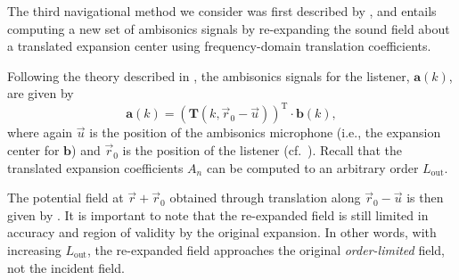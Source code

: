 The third navigational method we consider was first described by \citet{MenziesAlAkaidi2007a}, and entails computing a new set of ambisonics signals by re-expanding the sound field about a translated expansion center using frequency-domain translation coefficients.

Following the theory described in , the ambisonics signals for the listener, $\mathbf{a}(k)$, are given by
\begin{equation}\label{eq:03_Navigation_Techniques:Forward_Ambisonics_Translation}
\mathbf{a}(k) = \left( \mathbf{T}(k, \vec{r}_0 - \vec{u}) \right)^\text{T} \cdot \mathbf{b}(k),
\end{equation}
where again $\vec{u}$ is the position of the ambisonics microphone (i.e., the expansion center for $\mathbf{b}$) and $\vec{r}_0$ is the position of the listener (cf.~).
Recall that the translated expansion coefficients $A_n$ can be computed to an arbitrary order $L_\text{out}$.

The potential field at $\vec{r} + \vec{r}_0$ obtained through translation along $\vec{r}_0 - \vec{u}$ is then given by .
It is important to note that the re-expanded field is still limited in accuracy and region of validity by the original expansion.
In other words, with increasing $L_\text{out}$, the re-expanded field approaches the original \textit{order-limited} field, not the incident field.

